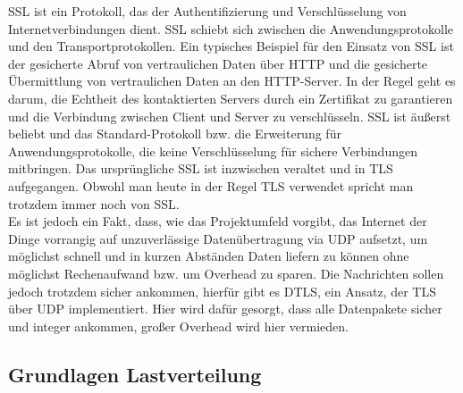 \documentclass[letterpaper, 12pt]{article}
\let\tempsubsection\subsection
\renewcommand\subsection[1]{\vspace{0cm}\tempsubsection{#1}\vspace{0cm}}
\begin{document}
SSL ist ein Protokoll, das der Authentifizierung und Verschlüsselung von Internetverbindungen dient. SSL schiebt sich zwischen die Anwendungsprotokolle und den Transportprotokollen. Ein typisches Beispiel für den Einsatz von SSL ist der gesicherte Abruf von vertraulichen Daten über HTTP und die gesicherte Übermittlung von vertraulichen Daten an den HTTP-Server. In der Regel geht es darum, die Echtheit des kontaktierten Servers durch ein Zertifikat zu garantieren und die Verbindung zwischen Client und Server zu verschlüsseln.
SSL ist äußerst beliebt und das Standard-Protokoll bzw. die Erweiterung für Anwendungsprotokolle, die keine Verschlüsselung für sichere Verbindungen mitbringen. Das ursprüngliche SSL ist inzwischen veraltet und in TLS aufgegangen. Obwohl man heute in der Regel TLS verwendet spricht man trotzdem immer noch von SSL. \\
Es ist jedoch ein Fakt, dass, wie das Projektumfeld vorgibt, das Internet der Dinge vorrangig auf unzuverlässige Datenübertragung via UDP aufsetzt, um möglichst schnell und in kurzen Abständen Daten liefern zu können ohne möglichst Rechenaufwand bzw. um Overhead zu sparen. Die Nachrichten sollen jedoch trotzdem sicher ankommen, hierfür gibt es DTLS, ein Ansatz, der TLS über UDP implementiert. Hier wird dafür gesorgt, dass alle Datenpakete sicher und integer ankommen, großer Overhead wird hier vermieden. \cite{tls, dtls}

\subsection{Grundlagen Lastverteilung}
\end{document}
